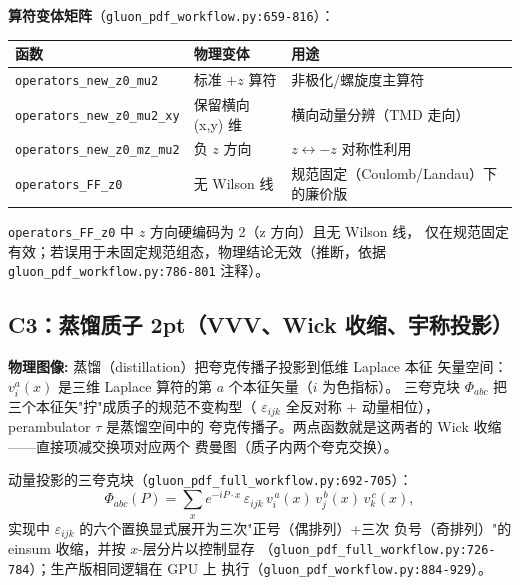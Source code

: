 \documentclass[UTF8]{ctexart}
\begin{document}
\textbf{算符变体矩阵}（\texttt{\nolinkurl{gluon\_pdf\_workflow.py:659-816}}）：
\begin{xltabular}{\textwidth}{llX}
\toprule
\textcolor{map}{函数} & 物理变体 & 用途 \\
\midrule
\endhead
\texttt{operators\_new\_z0\_mu2} & 标准 $+z$ 算符 & 非极化/螺旋度主算符 \\
\texttt{operators\_new\_z0\_mu2\_xy} & 保留横向 (x,y) 维 & 横向动量分辨（TMD 走向） \\
\texttt{operators\_new\_z0\_mz\_mu2} & 负 $z$ 方向 & $z\leftrightarrow -z$ 对称性利用 \\
\texttt{operators\_FF\_z0} & 无 Wilson 线 & 规范固定（Coulomb/Landau）下的廉价版 \\
\bottomrule
\end{xltabular}

\begin{warnbox}
\texttt{operators\_FF\_z0} 中 $z$ 方向硬编码为 2（z 方向）且无 Wilson 线，
仅在规范固定有效；若误用于未固定规范组态，物理结论无效（推断，依据
\texttt{\nolinkurl{gluon\_pdf\_workflow.py:786-801}} 注释）。
\end{warnbox}

\subsection{C3：蒸馏质子 2pt（VVV、Wick 收缩、宇称投影）}

\begin{physbox}
\textbf{物理图像:} 蒸馏（distillation）把夸克传播子投影到低维 Laplace 本征
矢量空间：$v^a_i(x)$ 是三维 Laplace 算符的第 $a$ 个本征矢量（$i$ 为色指标）。
三夸克块 $\Phi_{abc}$ 把三个本征矢"拧"成质子的规范不变构型（
$\varepsilon_{ijk}$ 全反对称 + 动量相位），perambulator $\tau$ 是蒸馏空间中的
夸克传播子。两点函数就是这两者的 Wick 收缩——直接项减交换项对应两个
费曼图（质子内两个夸克交换）。
\end{physbox}

动量投影的三夸克块（\texttt{\nolinkurl{gluon\_pdf\_full\_workflow.py:692-705}}）：
\begin{equation}\label{eq:vvv}
\Phi_{abc}(P) = \sum_{x} e^{-iP\cdot x}\, \varepsilon_{ijk}\,
v_i^{\,a}(x)\, v_j^{\,b}(x)\, v_k^{\,c}(x),
\end{equation}
实现中 $\varepsilon_{ijk}$ 的六个置换显式展开为三次"正号（偶排列）+三次
负号（奇排列）"的 einsum 收缩，并按 $x$-层分片以控制显存
（\texttt{\nolinkurl{gluon\_pdf\_full\_workflow.py:726-784}}）；生产版相同逻辑在 GPU 上
执行（\texttt{\nolinkurl{gluon\_pdf\_workflow.py:884-929}}）。
\end{document}
